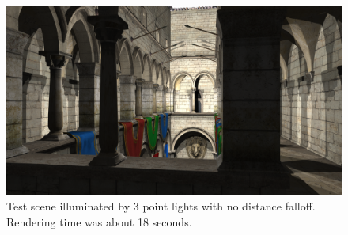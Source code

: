 \begin{figure}[htb]
  \begin{center}
    \includegraphics[width=\textwidth]{chapters/results/sponza_point.png}
  \end{center}
  \caption{Test scene illuminated by 3 point lights with no distance falloff. Rendering time was about 18 seconds.}
\end{figure}
